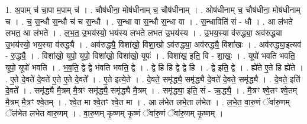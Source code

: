 \documentclass[17pt]{extarticle}
\begin{document}
1. अ॒पाम् च॑ चा॒पा म॒पाम् च॑ । . चौष॑धीना॒ मोष॑धीनाम् च॒ चौष॑धीनाम् । . ओष॑धीनाम् च॒ चौष॑धीना॒ मोष॑धीनाम् च । . च॒ स॒न्धौ स॒न्धौ च॑ च स॒न्धौ । . स॒न्धा वा स॒न्धौ स॒न्धा वा । . स॒न्धाविति॑ सं - धौ । . आ ल॑भते लभत॒ आ ल॑भते । . ल॒भ॒त॒ उ॒भय॑स्यो॒ भय॑स्य लभते लभत उ॒भय॑स्य । . उ॒भय॒स्या व॑रुद्ध्या॒ अव॑रुद्ध्या उ॒भय॑स्यो॒ भय॒स्या व॑रुद्ध्यै । . अव॑रुद्ध्यै॒ विशा॑खो॒ विशा॒खो ऽव॑रुद्ध्या॒ अव॑रुद्ध्यै॒ विशा॑खः । . अव॑रुद्ध्या॒इत्यव॑ - रु॒द्ध्यै॒ । . विशा॑खो॒ यूपो॒ यूपो॒ विशा॑खो॒ विशा॑खो॒ यूपः॑ । . विशा॑ख॒ इति॒ वि - शा॒खः॒ । . यूपो॑ भवति भवति॒ यूपो॒ यूपो॑ भवति । . भ॒व॒ति॒ द्वे द्वे भ॑वति भवति॒ द्वे । . द्वे हि हि द्वे द्वे हि । . द्वे इति॒ द्वे । . ह्ये॑ते ए॒ते हि ह्ये॑ते । . ए॒ते दे॒वते॑ दे॒वते॑ ए॒ते ए॒ते दे॒वते᳚ । . ए॒ते इत्ये॒ते । . दे॒वते॒ समृ॑द्ध्यै॒ समृ॑द्ध्यै दे॒वते॑ दे॒वते॒ समृ॑द्ध्यै । . दे॒वते॒ इति॑ दे॒वते᳚ । . समृ॑द्ध्यै मै॒त्रम् मै॒त्रꣳ समृ॑द्ध्यै॒ समृ॑द्ध्यै मै॒त्रम् । . समृ॑द्ध्या॒ इति॒ सं - ऋ॒द्ध्यै॒ । . मै॒त्रꣳ श्वे॒तꣳ श्वे॒तम् मै॒त्रम् मै॒त्रꣳ श्वे॒तम् । . श्वे॒त मा श्वे॒तꣳ श्वे॒त मा । . आ ल॑भेत लभे॒ता ल॑भेत । . ल॒भे॒त॒ वा॒रु॒णं ॅवा॑रु॒णम् ॅल॑भेत लभेत वारु॒णम् । . वा॒रु॒णम् कृ॒ष्णम् कृ॒ष्णं ॅवा॑रु॒णं ॅवा॑रु॒णम् कृ॒ष्णम् । \newline
\end{document}
